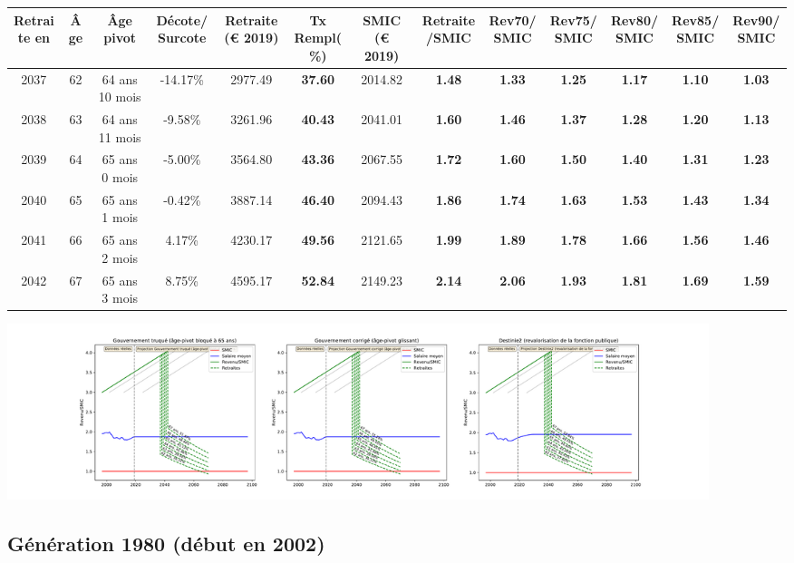 { \scriptsize \begin{center} 
\begin{tabular}[htb]{|c|c||c|c||c|c||c||c|c|c|c|c|c|} 
\hline 
 Retraite en &  Âge &  Âge pivot &  Décote/Surcote &  Retraite (\euro{} 2019) &  Tx Rempl(\%) &  SMIC (\euro{} 2019) &  Retraite/SMIC &  Rev70/SMIC &  Rev75/SMIC &  Rev80/SMIC &  Rev85/SMIC &  Rev90/SMIC \\ 
\hline \hline 
 2037 &  62 &  64 ans 10 mois &  -14.17\% &  2977.49 &  {\bf 37.60} &  2014.82 &  {\bf 1.48} &  {\bf 1.33} &  {\bf 1.25} &  {\bf 1.17} &  {\bf 1.10} &  {\bf 1.03} \\ 
\hline 
 2038 &  63 &  64 ans 11 mois &  -9.58\% &  3261.96 &  {\bf 40.43} &  2041.01 &  {\bf 1.60} &  {\bf 1.46} &  {\bf 1.37} &  {\bf 1.28} &  {\bf 1.20} &  {\bf 1.13} \\ 
\hline 
 2039 &  64 &  65 ans 0 mois &  -5.00\% &  3564.80 &  {\bf 43.36} &  2067.55 &  {\bf 1.72} &  {\bf 1.60} &  {\bf 1.50} &  {\bf 1.40} &  {\bf 1.31} &  {\bf 1.23} \\ 
\hline 
 2040 &  65 &  65 ans 1 mois &  -0.42\% &  3887.14 &  {\bf 46.40} &  2094.43 &  {\bf 1.86} &  {\bf 1.74} &  {\bf 1.63} &  {\bf 1.53} &  {\bf 1.43} &  {\bf 1.34} \\ 
\hline 
 2041 &  66 &  65 ans 2 mois &  4.17\% &  4230.17 &  {\bf 49.56} &  2121.65 &  {\bf 1.99} &  {\bf 1.89} &  {\bf 1.78} &  {\bf 1.66} &  {\bf 1.56} &  {\bf 1.46} \\ 
\hline 
 2042 &  67 &  65 ans 3 mois &  8.75\% &  4595.17 &  {\bf 52.84} &  2149.23 &  {\bf 2.14} &  {\bf 2.06} &  {\bf 1.93} &  {\bf 1.81} &  {\bf 1.69} &  {\bf 1.59} \\ 
\hline 
\hline 
\end{tabular} 
\end{center} } 

 \begin{center}\includegraphics[width=0.9\textwidth]{fig/Ascendant34_1975_22_dest_retraite.pdf}\end{center} \label{fig/Ascendant34_1975_22_dest_retraite.pdf} 

\newpage 
 
\subsection{Génération 1980 (début en 2002)} 

